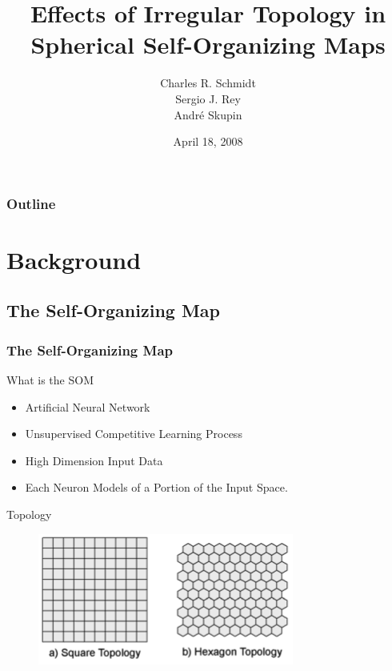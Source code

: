 \documentclass[nototal,handout]{beamer}
\author[Schmidt, Rey, Skupin]{Charles R. Schmidt\\Sergio J. Rey\\Andr\'e Skupin}
\institute[SDSU]{Department of Geography\\San Diego State University}
\title[Irregular Topology in Spherical-SOM]{Effects of Irregular Topology in Spherical Self-Organizing Maps}
\subtitle{}
\date[AAG]{April 18, 2008}
\begin{document}
\begin{frame}
  \titlepage
\end{frame}
\begin{frame}
  \frametitle{Outline}
  \tableofcontents[pausesections]
\end{frame}



\section{Background} 

\subsection{The Self-Organizing Map} 

\begin{frame}
	\frametitle{The Self-Organizing Map}
 
\begin{block}{What is the SOM}
 \begin{itemize}
 \item  Artificial Neural Network
 \item  Unsupervised Competitive Learning Process
 \item  High Dimension Input Data
 \item  Each Neuron Models of a Portion of the Input Space.
 \end{itemize}
 \end{block} 
\begin{block}{Topology}
  \begin{center}
  \begin{figure}
  \includegraphics[width=0.60\linewidth]{topologies.png}
  \end{figure}
  \end{center}
 \end{block} \end{frame} 
\end{document}

